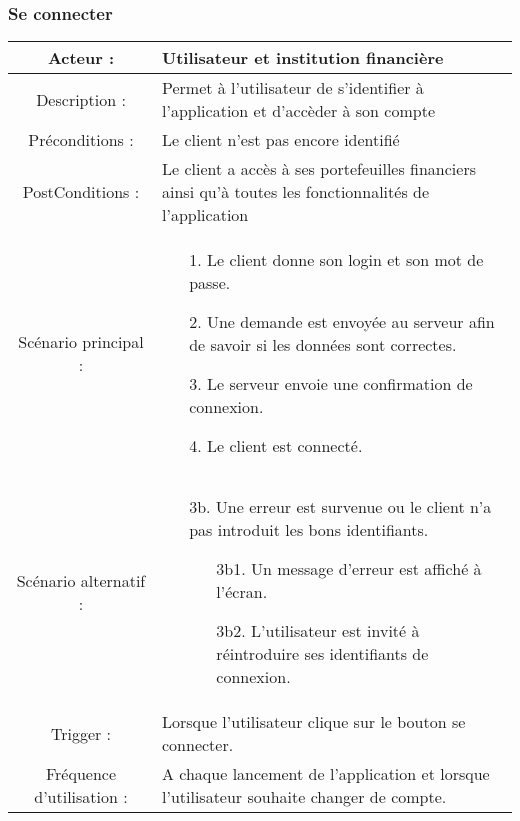 \documentclass{article}
\begin{document}
\subsubsection{Se connecter}
   \begin{table}[!h]
         \begin{tabular}{|c|p{10cm}|}
            \hline
            Acteur : & Utilisateur et institution financière   \\
            \hline
            Description : & Permet à l'utilisateur de s'identifier à l'application et d'accèder à son compte \\
            \hline
            Préconditions : &Le client n'est pas encore identifié   \\
            \hline
            PostConditions : &Le client a accès à ses portefeuilles financiers ainsi qu'à toutes les fonctionnalités de l'application   \\
            \hline
            Scénario principal : & 
                  \begin{itemize}
                     \item[1.] Le client donne son login et son mot de passe.
                     \item[2.] Une demande est envoyée au serveur afin de savoir si les données sont correctes.
                     \item[3.] Le serveur envoie une confirmation de connexion.
                     \item[4.] Le client est connecté. 
                  \end{itemize}     \\
            \hline
            Scénario alternatif : &
                  \begin{itemize}
                     \item[3b.] Une erreur est survenue ou le client n'a pas introduit les bons identifiants.
                     \begin{itemize}
                        \item[3b1.] Un message d'erreur est affiché à l'écran. 
                        \item[3b2.] L'utilisateur est invité à réintroduire ses identifiants de connexion. 
                     \end{itemize} 
                  \end{itemize}      \\
            \hline
            Trigger : & Lorsque l'utilisateur clique sur le bouton se connecter.    \\
            \hline
            Fréquence d'utilisation : & A chaque lancement de l'application et lorsque l'utilisateur souhaite changer de compte.     \\
            \hline
         \end{tabular}
   \end{table}
\end{document}
